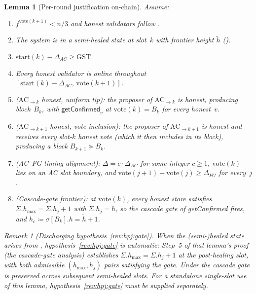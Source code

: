 \documentclass{article}
\newcommand{\hmax}{\ensuremath{h_{\max}}\xspace}
\newcommand{\start}{\ensuremath{\mathrm{start}}}
\newcommand{\vote}{\ensuremath{\mathrm{vote}}}
\newcommand{\GST}{\ensuremath{\mathrm{GST}}\xspace}
\newcommand{\comm}[1]{\ensuremath{\widetilde{#1}}}
\newcommand{\getConfirmed}{\textsf{getConfirmed}\xspace}
\theoremstyle{plain}
\newtheorem{lemma}{Lemma}
\theoremstyle{definition}
\theoremstyle{remark}
\newtheorem{remark}[theorem]{Remark}
\begin{document}
\begin{lemma}[Per-round justification on-chain]\label{lem:per-round-justification}
Assume:
\begin{enumerate}
  \item\label{rev:hpj:f} $f^{\vote(k+1)} < n/3$ and honest validators follow .
  \item\label{rev:hpj:healed} The system is in a semi-healed state at slot~$k$ with frontier height $\comm{h}$ ().
  \item\label{rev:hpj:gst} $\start(k) - \Delta_{\mathit{AC}} \geq \GST$.
  \item\label{rev:hpj:online} Every honest validator is online throughout $[\start(k) - \Delta_{\mathit{AC}},\, \vote(k+1)]$.
  \item\label{rev:hpj:ack-honest} \emph{($\mathrm{AC}_{\to k}$ honest, uniform tip):} the proposer of $\mathrm{AC}_{\to k}$ is honest, producing block~$B_k$, with $\getConfirmed_v$ at $\vote(k) = B_k$ for every honest~$v$.
  \item\label{rev:hpj:ack1-honest} \emph{($\mathrm{AC}_{\to k+1}$ honest, vote inclusion):} the proposer of $\mathrm{AC}_{\to k+1}$ is honest and receives every slot-$k$ honest vote (which it then includes in its block), producing a block $B_{k+1} \succeq B_k$.
  \item\label{rev:hpj:align} \emph{(AC--FG timing alignment):} $\Delta = c \cdot \Delta_{\mathit{AC}}$ for some integer $c \geq 1$, $\vote(k)$ lies on an AC slot boundary, and $\vote(j+1) - \vote(j) \geq \Delta_{\mathit{FG}}$ for every~$j$.
  \item\label{rev:hpj:gate} \emph{(Cascade-gate frontier):} at $\vote(k)$, every honest store satisfies $\Sigma.\hmax = \Sigma.h_j + 1$ with $\Sigma.h_j = \comm{h}$, so the cascade gate of \getConfirmed{} fires, and $h_c \coloneqq \sigma[B_k].h = \comm{h} + 1$.
\end{enumerate}

\begin{remark}[Discharging hypothesis~\ref{rev:hpj:gate}]
When the (semi-)healed state arises from , hypothesis~\ref{rev:hpj:gate} is automatic: Step~5 of that lemma's proof (the cascade-gate analysis) establishes $\Sigma.\hmax = \Sigma.h_j + 1$ at the post-healing slot, with both admissible $(\hmax, h_j)$ pairs satisfying the gate. Under  the cascade gate is preserved across subsequent semi-healed slots.
For a standalone single-slot use of this lemma, hypothesis~\ref{rev:hpj:gate} must be supplied separately.
\end{remark}


\end{lemma}
\end{document}
